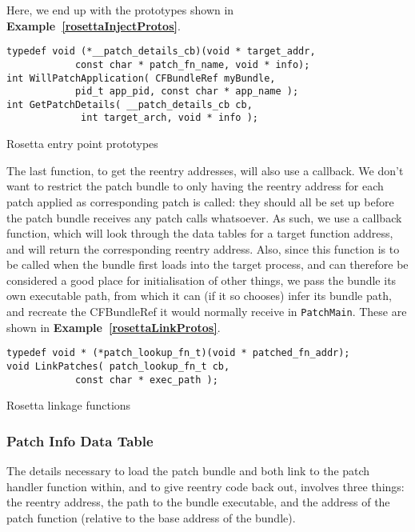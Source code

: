 \documentclass[english]{article}
\begin{document}
Here, we end up with the prototypes shown in \textbf{Example~\ref{rosettaInjectProtos}}.

\begin{sourcecode}
\begin{verbatim}
typedef void (*__patch_details_cb)(void * target_addr, 
            const char * patch_fn_name, void * info);
int WillPatchApplication( CFBundleRef myBundle, 
            pid_t app_pid, const char * app_name );
int GetPatchDetails( __patch_details_cb cb,
             int target_arch, void * info );
\end{verbatim}
\caption{Rosetta entry point prototypes}
\label{rosettaInjectProtos}
\end{sourcecode}

The last function, to get the reentry addresses, will also use a callback. We don't want to restrict the patch bundle to only having the reentry address for each patch applied as corresponding patch is called: they should all be set up before the patch bundle receives any patch calls whatsoever. As such, we use a callback function, which will look through the data tables for a target function address, and will return the corresponding reentry address. Also, since this function is to be called when the bundle first loads into the target process, and can therefore be considered a good place for initialisation of other things, we pass the bundle its own executable path, from which it can (if it so chooses) infer its bundle path, and recreate the CFBundleRef it would normally receive in \texttt{PatchMain}. These are shown in \textbf{Example~\ref{rosettaLinkProtos}}.

\begin{sourcecode}
\begin{verbatim}
typedef void * (*patch_lookup_fn_t)(void * patched_fn_addr);
void LinkPatches( patch_lookup_fn_t cb, 
            const char * exec_path );
\end{verbatim}
\caption{Rosetta linkage functions}
\label{rosettaLinkProtos}
\end{sourcecode}

\subsubsection{Patch Info Data Table}
The details necessary to load the patch bundle and both link to the patch handler function within, and to give reentry code back out, involves three things: the reentry address, the path to the bundle executable, and the address of the patch function (relative to the base address of the bundle).
\end{document}

